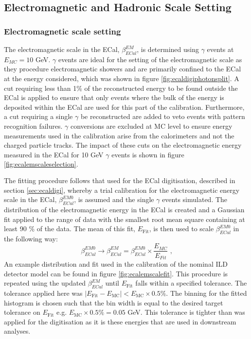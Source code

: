 \subsection{Electromagnetic and Hadronic Scale Setting}
\label{sec:scalesetting}


\subsubsection{Electromagnetic scale setting}
\label{sec:emscalesetting}
The electromagnetic scale in the ECal, $\beta^{EM}_{ECal}$, is determined using $\gamma$ events at $E_{MC} = 10$ GeV.  $\gamma$ events are ideal for the setting of the electromagnetic scale as they procedure electromagnetic showers and are primarily confined to the ECal at the energy considered, which was shown in figure \ref{fig:ecaldigiphotonsplit}.  A cut requiring less than 1\% of the reconstructed energy to be found outside the ECal is applied to ensure that only events where the bulk of the energy is deposited within the ECal are used for this part of the calibration.  Furthermore, a cut requiring a single $\gamma$ be reconstructed are added to veto events with pattern recognition failures.  $\gamma$ conversions are excluded at MC level to ensure energy measurements used in the calibration arise from the calorimeters and not the charged particle tracks.  The impact of these cuts on the electromagnetic energy measured in the ECal for 10 GeV $\gamma$ events is shown in figure \ref{fig:ecalemscaleselection}.   

The fitting procedure follows that used for the ECal digitisation, described in section \ref{sec:ecaldigi}, whereby a trial calibration for the electromagnetic energy scale in the ECal, $\beta^{EM0}_{ECal}$, is assumed and the single $\gamma$ events simulated.  The distribution of the electromagnetic energy in the ECal is created and a Gaussian fit applied to the range of data with the smallest root mean square containing at least 90 \% of the data.  The mean of this fit, $E_{\text{Fit}}$, is then used to scale $\beta^{EM0}_{ECal}$ in the following way:
%
\begin{equation}
\beta^{EM0}_{ECal} \rightarrow \beta^{EM}_{ECal} = \beta^{EM0}_{ECal} \times \frac{E_{MC}}{E_{Fit}}\text{ ,}
\end{equation}
%
An example distribution and fit used in the calibration of the nominal ILD detector model can be found in figure \ref{fig:ecalemscalefit}.  This procedure is repeated using the updated $\beta^{EM}_{ECal}$ until $E_{\text{Fit}}$ falls within a specified tolerance.  The tolerance applied here was $|E_{\text{Fit}} - E_{\text{MC}}| < E_{\text{MC}} \times 0.5 \%$.  The binning for the fitted histogram is chosen such that the bin width is equal to the desired target tolerance on $E_{\text{Fit}}$ e.g. $E_{\text{MC}} \times 0.5 \% = 0.05$ GeV.  This tolerance is tighter than was applied for the digitisation as it is these energies that are used in downstream analyses.   
 
